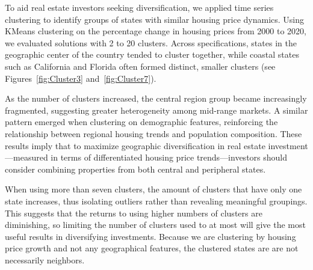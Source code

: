 \documentclass[11pt]{amsart}
\begin{document}
To aid real estate investors seeking diversification, we applied time series clustering to identify groups of states with similar housing price dynamics. Using KMeans clustering on the percentage change in housing prices from 2000 to 2020, we evaluated solutions with 2 to 20 clusters. Across specifications, states in the geographic center of the country tended to cluster together, while coastal states such as California and Florida often formed distinct, smaller clusters (see Figures~\ref{fig:Cluster3} and~\ref{fig:Cluster7}).

As the number of clusters increased, the central region group became increasingly fragmented, suggesting greater heterogeneity among mid-range markets. A similar pattern emerged when clustering on demographic features, reinforcing the relationship between regional housing trends and population composition. These results imply that to maximize geographic diversification in real estate investment—measured in terms of differentiated housing price trends—investors should consider combining properties from both central and peripheral states.

When using more than seven clusters, the amount of clusters that have only one state increases, thus isolating outliers rather than revealing meaningful groupings.
This suggests that the returns to using higher numbers of clusters are diminishing, so limiting the number of clusters used to at most will give the most useful results in diversifying investments.
Because we are clustering by housing price growth and not any geographical features, the clustered states are are not necessarily neighbors.

\end{document}

